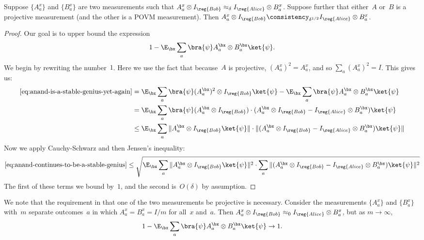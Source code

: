 \begin{fact}\label{fact:almost-agreement}
Suppose $\{A^x_a\}$ and $\{B^x_a\}$ are two measurements such that $A^x_a \otimes I_{\reg{Bob}} \approx_{\delta} I_{\reg{Alice}} \otimes B^x_a$.
Suppose further that either~$A$ or~$B$ is a projective measurement (and the other is a POVM measurement).
Then $A^x_a \otimes I_{\reg{Bob}} \consistency_{\delta^{1/2}} I_{\reg{Alice}} \otimes B^x_a$.
\end{fact}
\begin{proof}
Our goal is to upper bound the expression
\begin{equation}\label{eq:anand-is-a-stable-genius-yet-again}
1 - \E_\bx \sum_a \bra{\psi} A^{\bx}_a \otimes B^{\bx}_a \ket{\psi}.
\end{equation}
We begin by rewriting the number~$1$.
Here we use the fact that because~$A$ is projective, $(A^x_a)^2 = A^x_a$,
and so $\sum_a (A^x_a)^2 = I$.
This gives us:
\begin{align}
\eqref{eq:anand-is-a-stable-genius-yet-again}
& = \E_\bx \sum_a \bra{\psi} (A^{\bx}_a)^2 \otimes I_{\reg{Bob}} \ket{\psi} - \E_\bx \sum_a \bra{\psi} A^{\bx}_a \otimes B^{\bx}_a \ket{\psi}\nonumber\\
& = \E_\bx \sum_a \bra{\psi} (A^{\bx}_a \otimes I_{\reg{Bob}}) \cdot (A^{\bx}_a \otimes I_{\reg{Bob}} - I_{\reg{Alice}} \otimes B^{\bx}_a) \ket{\psi}\nonumber\\
& \leq \E_\bx \sum_a \Vert A^{\bx}_a \otimes I_{\reg{Bob}} \ket{\psi}\Vert \cdot \Vert(A^{\bx}_a \otimes I_{\reg{Bob}} - I_{\reg{Alice}} \otimes B^{\bx}_a) \ket{\psi}\Vert\label{eq:anand-continues-to-be-a-stable-genius}
\end{align}
Now we apply Cauchy-Schwarz and then Jensen's inequality:
\begin{equation*}
\eqref{eq:anand-continues-to-be-a-stable-genius}
\leq  \sqrt{\E_\bx \sum_a \Vert A^{\bx}_a \otimes I_{\reg{Bob}} \ket{\psi}\Vert^2
	\cdot \sum_a \Vert(A^{\bx}_a \otimes I_{\reg{Bob}} - I_{\reg{Alice}} \otimes B^{\bx}_a) \ket{\psi}\Vert^2}
\end{equation*}
The first of these terms we bound by~$1$, and the second is~$O(\delta)$ by assumption.
\end{proof}

\begin{remark}\label{remark:fraction-of-identity}
We note that the requirement in 
that one of the two measurements be projective is necessary.
Consider the measurements $\{A^x_a\}$ and $\{B^x_a\}$ with~$m$ separate outcomes~$a$
in which $A^x_a = B^x_a = I/m$ for all~$x$ and~$a$. Then $A^x_a \otimes I_{\reg{Bob}} \approx_{0} I_{\reg{Alice}} \otimes B^x_a$, but as $m \rightarrow \infty$,
\begin{equation*}
1- \E_\bx \sum_a \bra{\psi} A^{\bx}_a \otimes B^{\bx}_a \ket{\psi} \rightarrow 1.
\end{equation*}
\end{remark}

